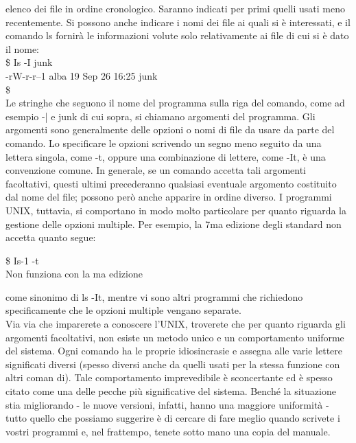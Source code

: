 elenco dei file in ordine cronologico. Saranno indicati per primi quelli usati meno
 recentemente. Si possono anche indicare i nomi dei file ai quali si è interessati, e il
  comando ls fornirà le informazioni volute solo relativamente ai file di cui si è dato il nome:\\
\$ Is -I junk\\
-rW-r-r--1 alba 19 Sep 26 16:25 junk\\
\$\\
Le stringhe che seguono il nome del programma sulla riga del comando, come ad
esempio -| e junk di cui sopra, si chiamano argomenti del programma. Gli argomenti
sono generalmente delle opzioni o nomi di file da usare da parte del comando.
Lo specificare le opzioni scrivendo un segno meno seguito da una lettera singola,
come -t, oppure una combinazione di lettere, come -It, è una convenzione comune. In
generale, se un comando accetta tali argomenti facoltativi, questi ultimi precederanno
 qualsiasi eventuale argomento costituito dal nome del file; possono però anche
apparire in ordine diverso. I programmi UNIX, tuttavia, si comportano in modo
molto particolare per quanto riguarda la gestione delle opzioni multiple. Per esempio,
 la 7ma edizione degli standard non accetta quanto segue:
 \begin{multicols}{2}
 	\$ Is-1 -t\\
 	Non funziona con la ma edizione
 \end{multicols}
come sinonimo di ls -It, mentre vi sono altri programmi che richiedono specificamente
che le opzioni multiple vengano separate.\\
Via via che imparerete a conoscere l'UNIX, troverete che per quanto riguarda gli
argomenti facoltativi, non esiste un metodo unico e un comportamento uniforme del
sistema. Ogni comando ha le proprie idiosincrasie e assegna alle varie lettere significati
 diversi (spesso diversi anche da quelli usati per la stessa funzione con altri coman
di). Tale comportamento imprevedibile è sconcertante ed è spesso citato come una
delle pecche più significative del sistema. Benché la situazione stia migliorando - le
nuove versioni, infatti, hanno una maggiore uniformità - tutto quello che possiamo
suggerire è di cercare di fare meglio quando scrivete i vostri programmi e, nel
 frattempo, tenete sotto mano una copia del manuale.
